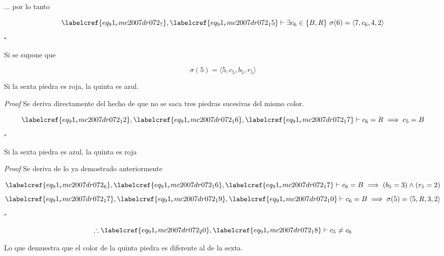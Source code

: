 ... por lo tanto

\begin{equation} \label{eq_91_rmc2007dr072_16}
	\labelcref{eq_91_rmc2007dr072_7}, \labelcref{eq_91_rmc2007dr072_15} \vdash \exists c_6 \in \{B,R\}\ \sigma(6) = \langle 7, c_6, 4, 2 \rangle
\end{equation}
\hfill $\square$

Si se supone que 

\begin{equation} \label{eq_91_rmc2007dr072_17}
	\sigma(5) = \langle 5, c_5, b_5, r_5 \rangle
\end{equation}

\begin{claim}
	Si la sexta piedra es roja, la quinta es azul.
\end{claim}

\textit{Proof} Se deriva directamente del hecho de que no se saca tres piedras sucesivas del mismo color.

\begin{equation} \label{eq_91_rmc2007dr072_18}
	\labelcref{eq_91_rmc2007dr072_12}, \labelcref{eq_91_rmc2007dr072_16}, \labelcref{eq_91_rmc2007dr072_17} \vdash c_6 = R \implies c_5=B
\end{equation}
\hfill $\square$

\begin{claim}
	Si la sexta piedra es azul, la quinta es roja
\end{claim}

\textit{Proof} Se deriva de lo ya demostrado anteriormente

\begin{equation} \label{eq_91_rmc2007dr072_19}
	\labelcref{eq_91_rmc2007dr072_6}, \labelcref{eq_91_rmc2007dr072_16}, \labelcref{eq_91_rmc2007dr072_17} \vdash c_6 = B \implies (b_5 = 3) \land (r_5=2)
\end{equation}
\begin{equation} \label{eq_91_rmc2007dr072_20}
	\labelcref{eq_91_rmc2007dr072_17}, \labelcref{eq_91_rmc2007dr072_19}, \labelcref{eq_91_rmc2007dr072_10} \vdash c_6 = B \implies \sigma(5) = \langle 5, R, 3, 2 \rangle
\end{equation}
\hfill $\square$

\begin{equation} \label{eq_91_rmc2007dr072_21}
	\therefore \labelcref{eq_91_rmc2007dr072_20}, \labelcref{eq_91_rmc2007dr072_18} \vdash c_5 \neq c_6
\end{equation}

\vspace{1cm}
Lo que demuestra que el color de la quinta piedra es diferente al de la sexta. \\\\\\
